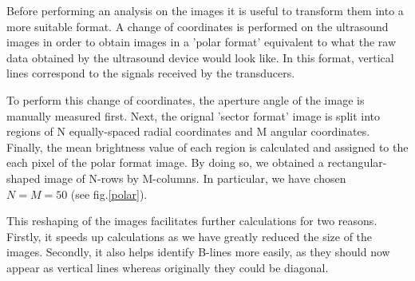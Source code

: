 \documentclass[12pt]{article} %
\begin{document}
	Before performing an analysis on the images it is useful to transform them into a more suitable format. A change of coordinates is performed on the ultrasound images in order to obtain images in a 'polar format' equivalent to what the raw data obtained by the ultrasound device would look like. In this format, vertical lines correspond to the signals received by the transducers. 
	
	To perform this change of coordinates, the aperture angle of the image is manually measured first. Next, the orignal 'sector format' image is split into regions of N equally-spaced radial coordinates and M angular coordinates. Finally, the mean brightness value of each region is calculated and assigned to the each pixel of the polar format image. By doing so, we obtained a rectangular-shaped image of N-rows by M-columns. In particular, we have chosen $N = M = 50$ (see fig.\ref{polar}). 
	
	This reshaping of the images facilitates further calculations for two reasons. Firstly, it speeds up calculations as we have greatly reduced the size of the images. Secondly, it also helps identify B-lines more easily, as they should now appear as vertical lines whereas originally they could be diagonal. 
	
	
\end{document}
